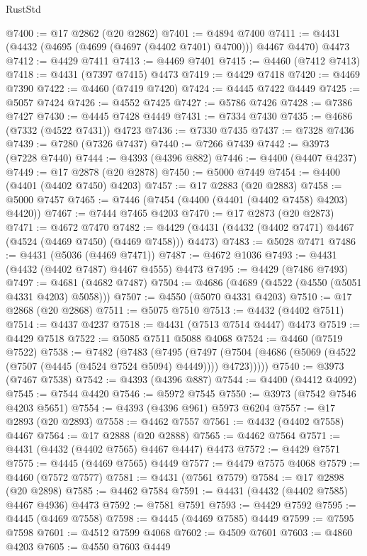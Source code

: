 \begin{lexlean}{RustStd}
\begin{coremodule}
@7400 := @17 @2862 (@20 @2862)
@7401 := @4894 @7400
@7411 := @4431 (@4432 (@4695 (@4699 (@4697 (@4402 @7401) @4700))) @4467 @4470) @4473
@7412 := @4429 @7411
@7413 := @4469 @7401
@7415 := @4460 (@7412 @7413)
@7418 := @4431 (@7397 @7415) @4473
@7419 := @4429 @7418
@7420 := @4469 @7390
@7422 := @4460 (@7419 @7420)
@7424 := @4445 @7422 @4449
@7425 := @5057 @7424
@7426 := @4552 @7425
@7427 := @5786 @7426
@7428 := @7386 @7427
@7430 := @4445 @7428 @4449
@7431 := @7334 @7430
@7435 := @4686 (@7332 (@4522 @7431)) @4723
@7436 := @7330 @7435
@7437 := @7328 @7436
@7439 := @7280 (@7326 @7437)
@7440 := @7266 @7439
@7442 := @3973 (@7228 @7440)
@7444 := @4393 (@4396 @882)
@7446 := @4400 (@4407 @4237)
@7449 := @17 @2878 (@20 @2878)
@7450 := @5000 @7449
@7454 := @4400 (@4401 (@4402 @7450) @4203)
@7457 := @17 @2883 (@20 @2883)
@7458 := @5000 @7457
@7465 := @7446 (@7454 (@4400 (@4401 (@4402 @7458) @4203) @4420))
@7467 := @7444 @7465 @4203
@7470 := @17 @2873 (@20 @2873)
@7471 := @4672 @7470
@7482 := @4429 (@4431 (@4432 (@4402 @7471) @4467 (@4524 (@4469 @7450) (@4469 @7458))) @4473)
@7483 := @5028 @7471
@7486 := @4431 (@5036 (@4469 @7471))
@7487 := @4672 @1036
@7493 := @4431 (@4432 (@4402 @7487) @4467 @4555) @4473
@7495 := @4429 (@7486 @7493)
@7497 := @4681 (@4682 @7487)
@7504 := @4686 (@4689 (@4522 (@4550 (@5051 @4331 @4203) @5058)))
@7507 := @4550 (@5070 @4331 @4203)
@7510 := @17 @2868 (@20 @2868)
@7511 := @5075 @7510
@7513 := @4432 (@4402 @7511)
@7514 := @4437 @4237
@7518 := @4431 (@7513 @7514 @4447) @4473
@7519 := @4429 @7518
@7522 := @5085 @7511 @5088 @4068
@7524 := @4460 (@7519 @7522)
@7538 := @7482
    (@7483
      (@7495
        (@7497 (@7504 (@4686 (@5069 (@4522 (@7507 (@4445 (@4524 @7524 @5094) @4449)))) @4723)))))
@7540 := @3973 (@7467 @7538)
@7542 := @4393 (@4396 @887)
@7544 := @4400 (@4412 @4092)
@7545 := @7544 @4420
@7546 := @5972 @7545
@7550 := @3973 (@7542 @7546 @4203 @5651)
@7554 := @4393 (@4396 @961) @5973 @6204
@7557 := @17 @2893 (@20 @2893)
@7558 := @4462 @7557
@7561 := @4432 (@4402 @7558) @4467
@7564 := @17 @2888 (@20 @2888)
@7565 := @4462 @7564
@7571 := @4431 (@4432 (@4402 @7565) @4467 @4447) @4473
@7572 := @4429 @7571
@7575 := @4445 (@4469 @7565) @4449
@7577 := @4479 @7575 @4068
@7579 := @4460 (@7572 @7577)
@7581 := @4431 (@7561 @7579)
@7584 := @17 @2898 (@20 @2898)
@7585 := @4462 @7584
@7591 := @4431 (@4432 (@4402 @7585) @4467 @4936) @4473
@7592 := @7581 @7591
@7593 := @4429 @7592
@7595 := @4445 (@4469 @7558)
@7598 := @4445 (@4469 @7585) @4449
@7599 := @7595 @7598
@7601 := @4512 @7599 @4068
@7602 := @4509 @7601
@7603 := @4860 @4203
@7605 := @4550 @7603 @4449

\end{coremodule}
\end{lexlean}
